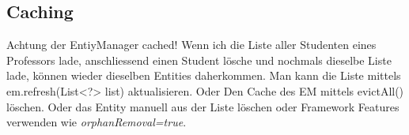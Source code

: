 \subsection{Caching}
Achtung der EntiyManager cached! Wenn ich die Liste aller Studenten eines Professors lade, anschliessend einen Student lösche und nochmals dieselbe Liste lade, können wieder dieselben Entities daherkommen. Man kann die Liste mittels em.refresh(List<?> list) aktualisieren. Oder Den Cache des EM mittels evictAll() löschen. Oder das Entity manuell aus der Liste löschen oder Framework Features verwenden wie \emph{orphanRemoval=true}.





